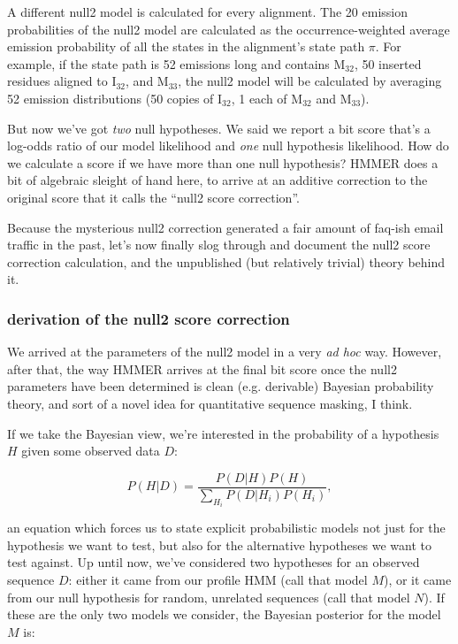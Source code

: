 A different null2 model is calculated for every alignment. The 20
emission probabilities of the null2 model are calculated as the
occurrence-weighted average emission probability of all the states in
the alignment's state path $\pi$. For example, if the state path is 52
emissions long and contains M$_{32}$, 50 inserted residues aligned to
I$_{32}$, and M$_{33}$, the null2 model will be calculated by averaging 52
emission distributions (50 copies of I$_{32}$, 1 each of M$_{32}$ and
M$_{33}$). 

But now we've got \emph{two} null hypotheses. We said we report a bit
score that's a log-odds ratio of our model likelihood and \emph{one}
null hypothesis likelihood. How do we calculate a score if we have
more than one null hypothesis? HMMER does a bit of algebraic sleight
of hand here, to arrive at an additive correction to the original
score that it calls the ``null2 score correction''. 

Because the mysterious null2 correction generated a fair amount of
faq-ish email traffic in the past, let's now finally slog through and
document the null2 score correction calculation, and the unpublished
(but relatively trivial) theory behind it.

\subsubsection{derivation of the null2 score correction}

We arrived at the parameters of the null2 model in a very \emph{ad
hoc} way. However, after that, the way HMMER arrives at the final bit
score once the null2 parameters have been determined is clean
(e.g. derivable) Bayesian probability theory, and sort of a novel
idea for quantitative sequence masking, I think.

If we take the Bayesian view, we're interested in the probability of a
hypothesis $H$ given some observed data $D$:

\[
   P(H | D) = \frac{P(D | H) P(H)}{\sum_{H_i} P(D | H_i) P(H_i)},
\]

an equation which forces us to state explicit probabilistic models not
just for the hypothesis we want to test, but also for the alternative
hypotheses we want to test against. Up until now, we've considered two
hypotheses for an observed sequence $D$: either it came from our
profile HMM (call that model $M$), or it came from our null hypothesis
for random, unrelated sequences (call that model $N$). If these are
the only two models we consider, the Bayesian posterior for the model
$M$ is:

